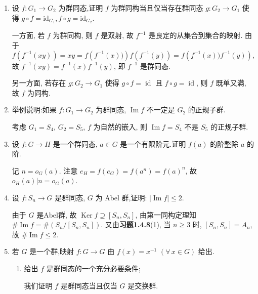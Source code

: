 \begin{enumerate}
\item 设 $f: G_1 \rightarrow G_2$ 为群同态,证明 $f$ 为群同构当且仅当存在群同态 $g: G_2 \rightarrow G_1$ 使得 $g \circ f=\mathrm{id}_{G_1},f \circ g=\mathrm{id}_{G_2}$.
\begin{solution}
    一方面, 若 $f$ 为群同构, 则 $f$ 是双射, 
    故 $f^{-1}$ 是良定的从集合到集合的映射. 由于
    $$f\left( f^{-1}(xy) \right) = xy = f\left( f^{-1}(x)) \right) f\left( f^{-1}(y) \right) = f\left( f^{-1}(x)) f^{-1}(y) \right),$$
    故 $f^{-1}(xy)=f^{-1}(x)f^{-1}(y)$, 即 $f^{-1}$ 是群同态.

    另一方面, 若存在 $g: G_2 \to G_1$ 使得 $g\circ f =\operatorname{id}$ 
    且 $f\circ g =\operatorname{id}$, 则 $f$ 既单又满, 故 $f$ 为同构.
\end{solution}

\item 举例说明:如果 $f: G_1 \rightarrow G_2$ 为群同态, $\operatorname{Im} f$ 不一定是 $G_2$ 的正规子群.
\begin{solution}
    考虑 $G_1=S_4$, $G_2=S_5$, $f$ 为自然的嵌入,
    则 $\operatorname{Im} f = S_4$ 不是 $S_5$ 的正规子群. 
\end{solution}

\item 设 $f: G \rightarrow H$ 是一个群同态, $a \in G$ 是一个有限阶元.证明 $f(a)$ 的阶整除 $a$ 的阶.
\begin{solution}
    记 $n=o_G(a)$. 注意 $e_H=f(e_G)=f(a^n)=f(a)^n$, 故 $o_H(a) | n=o_G(a)$.
\end{solution}

\item 设 $f: S_n \rightarrow G$ 是群同态, $G$ 为 Abel 群,证明: $|\operatorname{Im} f| \leqslant 2$.
\begin{solution}
    由于 $G$ 是Abel群,
    故 $\operatorname{Ker} f \supseteq [S_n,S_n]$,
    由第一同构定理知
    $\#\operatorname{Im} f = \#\left( S_n / [S_n,S_n] \right)$.
    又由\textbf{习题1.4.8}(1),
    当 $n\geqslant 3$ 时, $[S_n,S_n]=A_n$,
    故 $\#\operatorname{Im} f \leqslant 2$. 
\end{solution}

\item 若 $G$ 是一个群,映射 $f: G \rightarrow G$ 由 $f(x)=x^{-1}$ $(\forall\, x \in G)$ 给出.
\begin{enumerate}[label=(\arabic*)]
\item 给出 $f$ 是群同态的一个充分必要条件;
\begin{solution}
    我们证明 $f$ 是群同态当且仅当 $G$ 是交换群. 


\end{solution}
\end{enumerate}
\end{enumerate}

